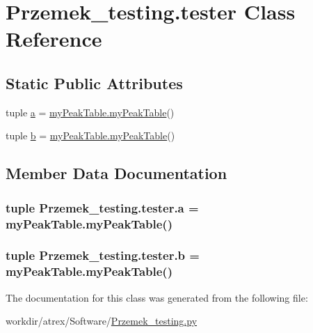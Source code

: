 \hypertarget{class_przemek__testing_1_1tester}{\section{Przemek\-\_\-testing.\-tester Class Reference}
\label{class_przemek__testing_1_1tester}
}
\subsection*{Static Public Attributes}
\begin{DoxyCompactItemize}
\item 
tuple \hyperlink{class_przemek__testing_1_1tester_a3b224f5c318c0a6ff10f84f3ed1ae172}{a} = \hyperlink{classmy_peak_table_1_1my_peak_table}{my\-Peak\-Table.\-my\-Peak\-Table}()
\item 
tuple \hyperlink{class_przemek__testing_1_1tester_a567760c83534060e622ca5c14ba7d393}{b} = \hyperlink{classmy_peak_table_1_1my_peak_table}{my\-Peak\-Table.\-my\-Peak\-Table}()
\end{DoxyCompactItemize}


\subsection{Member Data Documentation}
\hypertarget{class_przemek__testing_1_1tester_a3b224f5c318c0a6ff10f84f3ed1ae172}{
\subsubsection[{a}]{\setlength{\rightskip}{0pt plus 5cm}tuple Przemek\-\_\-testing.\-tester.\-a = {\bf my\-Peak\-Table.\-my\-Peak\-Table}()\hspace{0.3cm}{\ttfamily [static]}}}\label{class_przemek__testing_1_1tester_a3b224f5c318c0a6ff10f84f3ed1ae172}
\hypertarget{class_przemek__testing_1_1tester_a567760c83534060e622ca5c14ba7d393}{
\subsubsection[{b}]{\setlength{\rightskip}{0pt plus 5cm}tuple Przemek\-\_\-testing.\-tester.\-b = {\bf my\-Peak\-Table.\-my\-Peak\-Table}()\hspace{0.3cm}{\ttfamily [static]}}}\label{class_przemek__testing_1_1tester_a567760c83534060e622ca5c14ba7d393}


The documentation for this class was generated from the following file\-:\begin{DoxyCompactItemize}
\item 
workdir/atrex/\-Software/\hyperlink{_przemek__testing_8py}{Przemek\-\_\-testing.\-py}\end{DoxyCompactItemize}
